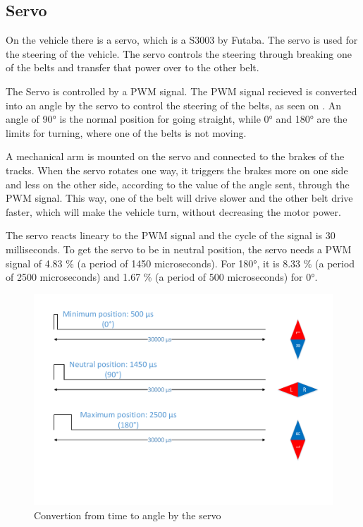 \subsection{Servo}
On the vehicle there is a servo, which is a S3003 by Futaba.
The servo is used for the steering of the vehicle. The servo controls the steering through breaking one of the belts and transfer that power over to the other belt.


The Servo is controlled by a PWM signal. The PWM signal recieved is converted into an angle by the servo to control the steering of the belts, as seen on . An angle of 90° is the normal position for going straight, while 0° and 180° are the limits for turning, where one of the belts is not moving. 

A mechanical arm is mounted on the servo and connected to the brakes of the tracks. When the servo rotates one way, it triggers the brakes more on one side and less on the other side, according to the value of the angle sent, through the PWM signal. This way, one of the belt will drive slower and the other belt drive faster, which will make the vehicle turn, without decreasing the motor power.

The servo reacts lineary to the PWM signal and the cycle of the signal is 30 milliseconds. To get the servo to be in neutral position, the servo needs a PWM signal of 4.83 \% (a period of 1450 microseconds). For 180°, it is 8.33 \% (a period of 2500 microseconds) and 1.67 \% (a period of 500 microseconds) for 0°. \\


\begin{figure}[H]
	\centering
	\includegraphics[scale=0.6]{figures/TimeVSangle.pdf}
	\caption{Convertion from time to angle by the servo}
	\label{timeVSangle}
\end{figure}

